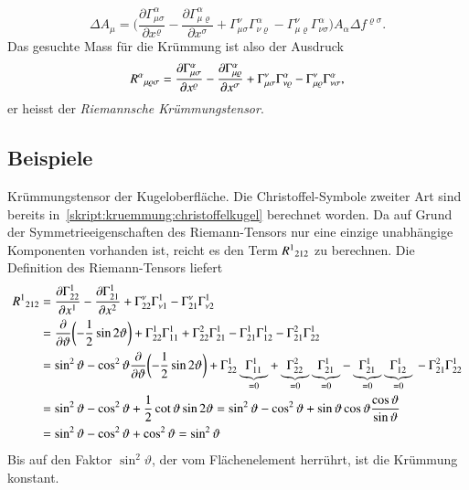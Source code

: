 \[
\Delta A_\mu
=
\biggl(
\frac{\partial \Gamma_{\mu\sigma}^\alpha}{\partial x^\varrho}
-
\frac{\partial \Gamma_{\mu\varrho}^\alpha}{\partial x^\sigma}
+
\Gamma_{\mu\sigma}^\nu
\Gamma_{\nu\varrho}^\alpha
-
\Gamma_{\mu\varrho}^\nu
\Gamma_{\nu\sigma}^\alpha
\biggr)
A_\alpha
\Delta f^{\varrho\sigma}.
\]
Das gesuchte Mass für die Krümmung ist also der Ausdruck
\begin{equation}
R^\alpha\mathstrut_{\mu\varrho\sigma}
=
\frac{\partial \Gamma_{\mu\sigma}^\alpha}{\partial x^\varrho}
-
\frac{\partial \Gamma_{\mu\varrho}^\alpha}{\partial x^\sigma}
+
\Gamma_{\mu\sigma}^\nu
\Gamma_{\nu\varrho}^\alpha
-
\Gamma_{\mu\varrho}^\nu
\Gamma_{\nu\sigma}^\alpha,
\label{skript:kruemmung:riemannmixed}
\end{equation}
er heisst der {\em Riemannsche Krümmungstensor}.
%
%

\subsection{Beispiele}

\begin{beispiel}
Krümmungstensor der Kugeloberfläche.
Die Christoffel-Symbole zweiter Art sind bereits
in~\eqref{skript:kruemmung:christoffelkugel}
berechnet worden.
Da auf Grund der Symmetrieeigenschaften des Riemann-Tensors nur eine
einzige unabhängige Komponenten vorhanden ist, reicht es den
Term $R^1\mathstrut_{212}$ zu berechnen.
Die Definition des Riemann-Tensors liefert
\begin{align*}
R^1\mathstrut_{212}
&=
\frac{\partial \Gamma_{22}^1}{\partial x^1}
-
\frac{\partial \Gamma_{21}^1}{\partial x^2}
+
\Gamma_{22}^\nu
\Gamma_{\nu1}^1
-
\Gamma_{21}^\nu
\Gamma_{\nu2}^1
\\
&=
\frac{\partial}{\partial\vartheta}\biggl(-\frac12\sin2\vartheta\biggr)
+
\Gamma_{22}^1
\Gamma_{11}^1
+
\Gamma_{22}^2
\Gamma_{21}^1
-
\Gamma_{21}^1
\Gamma_{12}^1
-
\Gamma_{21}^2
\Gamma_{22}^1
\\
&=
\sin^2\vartheta - \cos^2\vartheta
\frac{\partial}{\partial\vartheta}\biggl(-\frac12\sin2\vartheta\biggr)
+
\Gamma_{22}^1
\underbrace{\Gamma_{11}^1}_{=0}
+
\underbrace{\Gamma_{22}^2}_{=0}
\underbrace{\Gamma_{21}^1}_{=0}
-
\underbrace{\Gamma_{21}^1}_{=0}
\underbrace{\Gamma_{12}^1}_{=0}
\mathstrut
-
\Gamma_{21}^2
\Gamma_{22}^1
\\
&=
\sin^2\vartheta - \cos^2\vartheta
+
\frac12 \cot \vartheta \sin2\vartheta
=
\sin^2\vartheta - \cos^2\vartheta
+
\sin\vartheta\cos\vartheta\frac{\cos\vartheta}{\sin\vartheta}
\\
&=
\sin^2\vartheta - \cos^2\vartheta
+
\cos^2\vartheta
=
\sin^2\vartheta
\end{align*}
Bis auf den Faktor $\sin^2\vartheta$, der vom Flächenelement herrührt,
ist die Krümmung konstant.
\end{beispiel}

